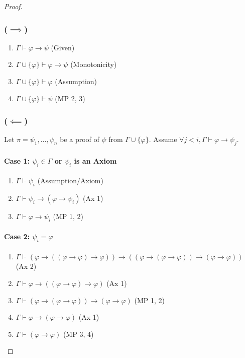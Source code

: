 \documentclass{article}
\begin{document}
\begin{proof}
    \subsubsection*{($\implies$)} 
    \begin{enumerate}
        \item $\Gamma \vdash \varphi \rightarrow \psi$ (Given)
        \item $\Gamma \cup \{\varphi\} \vdash \varphi \rightarrow \psi$ (Monotonicity)
        \item $\Gamma \cup \{\varphi\} \vdash \varphi$ (Assumption)
        \item $\Gamma \cup \{\varphi\} \vdash \psi$ (MP 2, 3)
    \end{enumerate}

    \subsubsection*{($\impliedby$)} 
    Let $\pi = \psi_1, \dots, \psi_n$ be a proof of $\psi$ from $\Gamma \cup \{\varphi\}$. Assume $\forall j < i, \Gamma \vdash \varphi \rightarrow \psi_j$.

    \paragraph{Case 1: $\psi_i \in \Gamma$ or $\psi_i$ is an Axiom}
    \begin{enumerate}
        \item $\Gamma \vdash \psi_i$ (Assumption/Axiom)
        \item $\Gamma \vdash \psi_i \rightarrow (\varphi \rightarrow \psi_i)$ (Ax 1)
        \item $\Gamma \vdash \varphi \rightarrow \psi_i$ (MP 1, 2)
    \end{enumerate}

    \paragraph{Case 2: $\psi_i = \varphi$}
    \begin{enumerate}
        \item $\Gamma \vdash (\varphi\rightarrow ((\varphi \rightarrow \varphi)\rightarrow \varphi)) \rightarrow ((\varphi\rightarrow (\varphi \rightarrow \varphi))\rightarrow (\varphi \rightarrow \varphi))$ (Ax 2)
        \item $\Gamma \vdash \varphi\rightarrow((\varphi\rightarrow \varphi)\rightarrow \varphi)$ (Ax 1)
        \item $\Gamma \vdash (\varphi\rightarrow(\varphi\rightarrow \varphi)) \rightarrow(\varphi \rightarrow \varphi)$ (MP 1, 2)
        \item $\Gamma \vdash \varphi \rightarrow(\varphi \rightarrow \varphi)$ (Ax 1)
        \item $\Gamma \vdash (\varphi \rightarrow \varphi)$ (MP 3, 4)
    \end{enumerate}


\end{proof}
\end{document}
